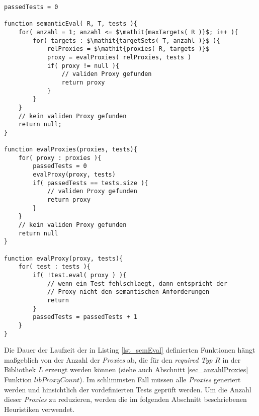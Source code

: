 \begin{lstlisting}[style = pseudo, caption = Semantische Evaluation ohne Heuristiken, captionpos = b, label = lst_semEval]
passedTests = 0

function semanticEval( R, T, tests ){
	for( anzahl = 1; anzahl <= $\mathit{maxTargets( R )}$; i++ ){
		for( targets : $\mathit{targetSets( T, anzahl )}$ ){
			relProxies = $\mathit{proxies( R, targets )}$
			proxy = evalProxies( relProxies, tests )	
			if( proxy != null ){
				// validen Proxy gefunden
				return proxy
			}
		}
	}
	// kein validen Proxy gefunden
	return null;
}

function evalProxies(proxies, tests){
	for( proxy : proxies ){
		passedTests = 0
		evalProxy(proxy, tests)
		if( passedTests == tests.size ){
			// validen Proxy gefunden
			return proxy
		}
	}
	// kein validen Proxy gefunden
	return null
}

function evalProxy(proxy, tests){
	for( test : tests ){
		if( !test.eval( proxy ) ){
			// wenn ein Test fehlschlaegt, dann entspricht der 
			// Proxy nicht den semantischen Anforderungen
			return
		}
		passedTests = passedTests + 1
	}
}
\end{lstlisting}
Die Dauer der Laufzeit der in Listing \ref{lst_semEval} definierten Funktionen hängt maßgeblich von der Anzahl der \emph{Proxies} ab, die für den \emph{required Typ} $R$ in der Bibliothek $L$ erzeugt werden können (siehe auch Abschnitt \ref{sec_anzahlProxies} Funktion $\mathit{libProxyCount}$). Im schlimmsten Fall müssen alle \emph{Proxies} generiert werden und hinsichtlich der vordefinierten Tests geprüft werden. Um die Anzahl dieser \emph{Proxies} zu reduzieren, werden die im folgenden Abschnitt beschriebenen Heuristiken verwendet.

